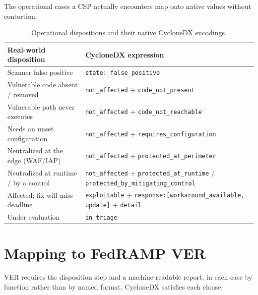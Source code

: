 \documentclass[11pt]{article}
\newcommand{\code}[1]{\texttt{#1}}
\begin{document}
The operational cases a CSP actually encounters map onto native values without
contortion:
\begin{table}[H]
\centering
\footnotesize
\renewcommand{\arraystretch}{1.25}
\begin{tabular}{>{\raggedright\arraybackslash}p{} >{\raggedright\arraybackslash}p{}}
\toprule
\textbf{Real-world disposition} & \textbf{CycloneDX expression} \\
\midrule
Scanner false positive & \code{state: false\_positive} \\
Vulnerable code absent / removed & \code{not\_affected} + \code{code\_not\_present} \\
Vulnerable path never executes & \code{not\_affected} + \code{code\_not\_reachable} \\
Needs an unset configuration & \code{not\_affected} + \code{requires\_configuration} \\
Neutralized at the edge (WAF/IAP) & \code{not\_affected} + \code{protected\_at\_perimeter} \\
Neutralized at runtime / by a control & \code{not\_affected} + \code{protected\_at\_runtime} / \code{protected\_by\_mitigating\_control} \\
Affected; fix will miss deadline & \code{exploitable} + \code{response:[workaround\_available, update]} + \code{detail} \\
Under evaluation & \code{in\_triage} \\
\bottomrule
\end{tabular}
\caption{Operational dispositions and their native CycloneDX encodings.}
\label{tab:cases}
\end{table}

\section{Mapping to FedRAMP VER}
\label{sec:vermap}
VER requires the disposition step and a machine-readable report, in each case by
function rather than by named format. CycloneDX satisfies each clause:
\end{document}
